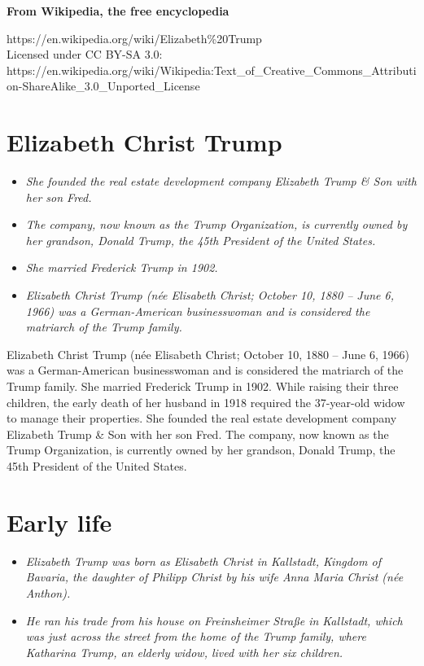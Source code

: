 \textbf{From Wikipedia, the free encyclopedia}

https://en.wikipedia.org/wiki/Elizabeth\%20Trump\\
Licensed under CC BY-SA 3.0:\\
https://en.wikipedia.org/wiki/Wikipedia:Text\_of\_Creative\_Commons\_Attribution-ShareAlike\_3.0\_Unported\_License

\section{Elizabeth Christ Trump}\label{elizabeth-christ-trump}

\begin{itemize}
\item
  \emph{She founded the real estate development company Elizabeth Trump
  \& Son with her son Fred.}
\item
  \emph{The company, now known as the Trump Organization, is currently
  owned by her grandson, Donald Trump, the 45th President of the United
  States.}
\item
  \emph{She married Frederick Trump in 1902.}
\item
  \emph{Elizabeth Christ Trump (née Elisabeth Christ; October 10, 1880
  -- June 6, 1966) was a German-American businesswoman and is considered
  the matriarch of the Trump family.}
\end{itemize}

Elizabeth Christ Trump (née Elisabeth Christ; October 10, 1880 -- June
6, 1966) was a German-American businesswoman and is considered the
matriarch of the Trump family. She married Frederick Trump in 1902.
While raising their three children, the early death of her husband in
1918 required the 37-year-old widow to manage their properties. She
founded the real estate development company Elizabeth Trump \& Son with
her son Fred. The company, now known as the Trump Organization, is
currently owned by her grandson, Donald Trump, the 45th President of the
United States.

\section{Early life}\label{early-life}

\begin{itemize}
\item
  \emph{Elizabeth Trump was born as Elisabeth Christ in Kallstadt,
  Kingdom of Bavaria, the daughter of Philipp Christ by his wife Anna
  Maria Christ (née Anthon).}
\item
  \emph{He ran his trade from his house on Freinsheimer Straße in
  Kallstadt, which was just across the street from the home of the Trump
  family, where Katharina Trump, an elderly widow, lived with her six
  children.}
\end{itemize}


